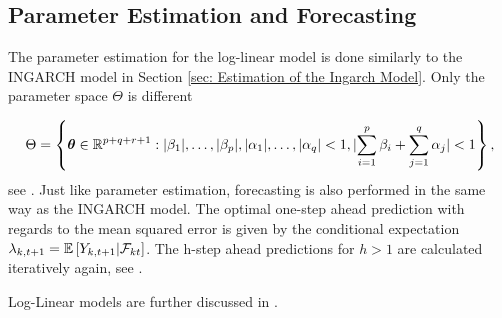 \subsection{Parameter Estimation and Forecasting}
\label{sec: Log-Linear Parameter Estimation and Forecasting}

The parameter estimation for the log-linear model is done similarly to the INGARCH model in Section \ref{sec: Estimation of the Ingarch Model}. Only the parameter space $\Theta$ is different

\begin{equation}
\Theta = \left\{ \bm{\theta} \in \mathbb{R}^{p+q+r+1}: \lvert\beta_1\rvert,\ldots,\lvert\beta_p\rvert,\lvert\alpha_1\rvert,\ldots,\lvert\alpha_q\rvert < 1, \lvert\sum_{i=1}^p\beta_i + \sum_{j=1}^q\alpha_j \rvert < 1 \right\},
\label{eq:Parameter Space log-linear}
\end{equation}
%
see \textcite{Liboschik:2016}. Just like parameter estimation, forecasting is also performed in the same way as the INGARCH model. The optimal one-step ahead prediction with regards to the mean squared error is given by the conditional expectation $\lambda_{k,t+1}=\mathbb{E}\left[Y_{k,t+1} | \mathcal{F}_{kt} \right]$. The h-step ahead predictions for $h>1$ are calculated iteratively again, see \textcite{Liboschik:2016}. 

Log-Linear models are further discussed in \textcite{Fokianos:2011,Woodard:2011,Douc:2013}.


%
%
%
%
%

